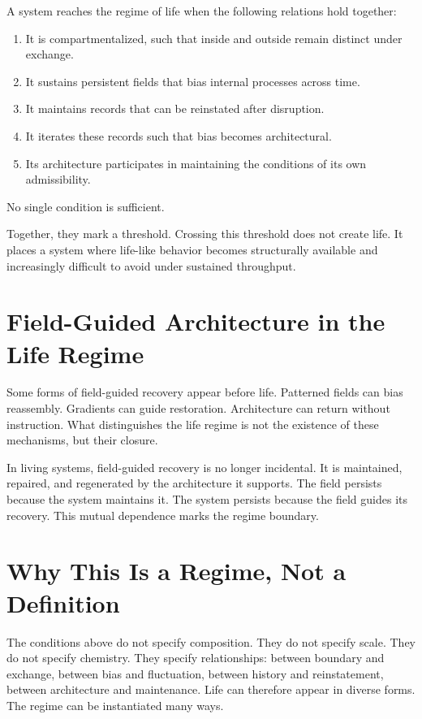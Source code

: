 \documentclass[11pt,twoside,openright]{book}
\begin{document}
A system reaches the regime of life when the following relations hold together:

\begin{enumerate}
\item It is compartmentalized, such that inside and outside remain distinct under exchange.
\item It sustains persistent fields that bias internal processes across time.
\item It maintains records that can be reinstated after disruption.
\item It iterates these records such that bias becomes architectural.
\item Its architecture participates in maintaining the conditions of its own admissibility.
\end{enumerate}

No single condition is sufficient.

Together, they mark a threshold. Crossing this threshold does not create life. It places a system where life-like behavior becomes structurally available and increasingly difficult to avoid under sustained throughput.

\section*{Field-Guided Architecture in the Life Regime}

Some forms of field-guided recovery appear before life. Patterned fields can bias reassembly. Gradients can guide restoration. Architecture can return without instruction. What distinguishes the life regime is not the existence of these mechanisms, but their closure.

In living systems, field-guided recovery is no longer incidental. It is maintained, repaired, and regenerated by the architecture it supports. The field persists because the system maintains it. The system persists because the field guides its recovery. This mutual dependence marks the regime boundary.

\section*{Why This Is a Regime, Not a Definition}

The conditions above do not specify composition. They do not specify scale. They do not specify chemistry. They specify relationships: between boundary and exchange, between bias and fluctuation, between history and reinstatement, between architecture and maintenance. Life can therefore appear in diverse forms. The regime can be instantiated many ways.
\end{document}
